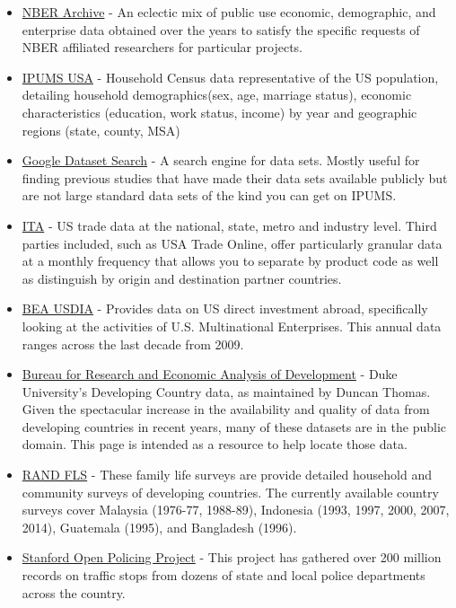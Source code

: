 \documentclass[addpoints, 12pt]{exam}
\begin{document}
\begin{itemize}
	\item \href{https://www.nber.org/research/data}{NBER Archive} - An eclectic mix of public use economic, demographic, and enterprise data obtained over the years to satisfy the specific requests of NBER affiliated researchers for particular projects.
	\item \href{https://usa.ipums.org/usa/index.shtml}{IPUMS USA} - Household Census data representative of the US population, detailing household demographics(sex, age, marriage status), economic characteristics (education, work status, income) by year and geographic regions (state, county, MSA)
	\item \href{https://datasetsearch.research.google.com/}{Google Dataset Search} - A search engine for data sets. Mostly useful for finding previous studies that have made their data sets available publicly but are not large standard data sets of the kind you can get on IPUMS.
	\item \href{https://www.trade.gov/trade-data-analysis}{ITA} - US trade data at the national, state, metro and industry level. Third parties included, such as USA Trade Online, offer particularly granular data at a monthly frequency that allows you to separate by product code as well as distinguish by origin and destination partner countries. 
	\item \href{https://www.bea.gov/international/di1usdop}{BEA USDIA} - Provides data on US direct investment abroad, specifically looking at the activities of U.S. Multinational Enterprises. 
	This annual data ranges across the last decade from 2009.
	\item \href{http://ipl.econ.duke.edu/dthomas/dev_data/index.html}{Bureau for Research and Economic Analysis of Development} - Duke University's Developing Country data, as maintained by Duncan Thomas. Given the spectacular increase in the availability and quality of data from developing countries in recent years, many of these datasets are in the public domain. This page is intended as a resource to help locate those data.
	\item \href{https://www.rand.org/well-being/social-and-behavioral-policy/data/FLS.html}{RAND FLS} - These family life surveys are provide detailed household and community surveys of developing countries. The currently available country surveys cover Malaysia (1976-77, 1988-89), Indonesia (1993, 1997, 2000, 2007, 2014), Guatemala (1995), and Bangladesh (1996).
	\item \href{https://openpolicing.stanford.edu/data/}{Stanford Open Policing Project} - This project has gathered over 200 million records on traffic stops from dozens of state and local police departments across the country.

\end{itemize}
\end{document}
